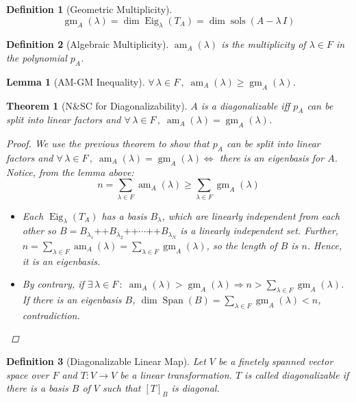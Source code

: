 \documentclass[12pt]{article}
\let\RA\Rightarrow
\let\LA\Leftarrow
\let\LR\Leftrightarrow
\newcommand{\Forall}[1]{\forall\,{#1}\,,\;}
\newcommand{\Exist}[1]{\exists\,{#1}\,:\;}
\DeclareMathOperator{\Span}{Span}
\DeclareMathOperator{\sols}{sols}
\DeclareMathOperator{\concat}{++}
\DeclareMathOperator{\Eig}{Eig}
\DeclareMathOperator{\am}{am}
\DeclareMathOperator{\gm}{gm}
\newtheorem{theorem}{Theorem}[subsection]
\newtheorem{definition}{Definition}[subsection]
\newtheorem{lemma}{Lemma}[subsection]
\begin{document}
\begin{definition}[Geometric Multiplicity]
  $$\gm_A(\lambda)=\dim\Eig_\lambda(T_A)=\dim\sols(A-\lambda\,I)$$
\end{definition}

\begin{definition}[Algebraic Multiplicity]
  $\am_A(\lambda)$ is the multiplicity of $\lambda\in F$ in the polynomial $p_A$.
\end{definition}

\begin{lemma}[AM-GM Inequality]
  $\Forall{\lambda\in F}\am_{A}(\lambda)\geq\gm_A(\lambda)$.
\end{lemma}

\begin{theorem}[N\&SC for Diagonalizability]
  $A$ is a diagonalizable iff $p_A$ can be split into linear factors and $\Forall{\lambda\in F}\am_{A}(\lambda)=\gm_A(\lambda)$.
  \begin{proof}
    We use the previous theorem to show that $p_A$ can be split into linear factors and $\Forall{\lambda\in F}\am_{A}(\lambda)=\gm_A(\lambda)\LR$ there is an eigenbasis for $A$. Notice, from the lemma above: $$n=\sum_{\lambda\in F}\am_A(\lambda)\geq \sum_{\lambda\in F}\gm_A(\lambda)$$
    \begin{itemize}
      \item [$(\RA)$] Each $\Eig_\lambda(T_A)$ has a basis $B_\lambda$, which are linearly independent from each other so $B=B_{\lambda_1}\concat B_{\lambda_2}\concat\cdots\concat B_{\lambda_N}$ is a linearly independent set. Further, $n=\sum_{\lambda\in F}\am_A(\lambda)=\sum_{\lambda\in F}\gm_A(\lambda)$, so the length of $B$ is $n$. Hence, it is an eigenbasis.
      \item [$(\LA)$] By contrary, if $\Exist{\lambda\in F}\am_A(\lambda)>\gm_A(\lambda)\RA n>\sum_{\lambda\in F}\gm_A(\lambda)$. If there is an eigenbasis $B$, $\dim\Span(B)=\sum_{\lambda\in F}\gm_A(\lambda)<n$, contradiction.
    \end{itemize}
  \end{proof}
\end{theorem}

\begin{definition}[Diagonalizable Linear Map]
  Let $V$ be a finetely spanned vector space over $F$ and $T: V \to V$ be a linear transformation. $T$ is called diagonalizable if there is a basis $B$ of $V$ such that $[T]_B$ is diagonal.
\end{definition}
\end{document}
